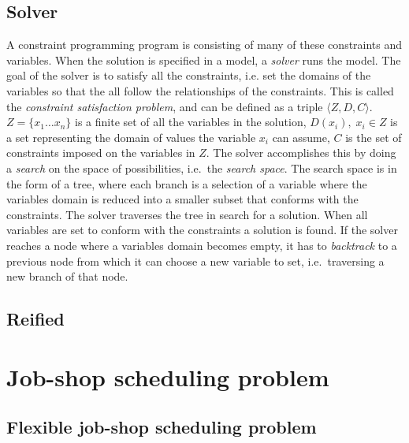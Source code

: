 \subsection{Solver}
A constraint programming program is consisting of many of these constraints and variables. When the solution is specified in a model, a \emph{solver} runs the model. The goal of the solver is to satisfy all the constraints, i.e. set the domains of the variables so that the all follow the relationships of the constraints. This is called the \emph{constraint satisfaction problem}, and can  be defined as a triple $\langle Z,D,C \rangle$. $Z=\{x_1 \ldots x_n\}$ is a finite set of all the variables in the solution, $D(x_i), \; x_i \in Z$ is a set representing the domain of values the variable $x_i$ can assume, $C$ is the set of constraints imposed on the variables in $Z$. The solver accomplishes this by doing a \emph{search} on the space of possibilities, i.e.\ the \emph{search space}. The search space is in the form of a tree, where each branch is a selection of a variable where the variables domain is reduced into a smaller subset that conforms with the constraints. The solver traverses the tree in search for a solution. When all variables are set to conform with the constraints a solution is found. If the solver reaches a node where a variables domain becomes empty, it has to \emph{backtrack} to a previous node from which it can choose a new variable to set, i.e.\ traversing a new branch of that node.

\cite{tsang_1993}
\cite{marriott_1998}
\cite{mz_manual}

\subsection{Reified}

\section{Job-shop scheduling problem}
\subsection{Flexible job-shop scheduling problem}

